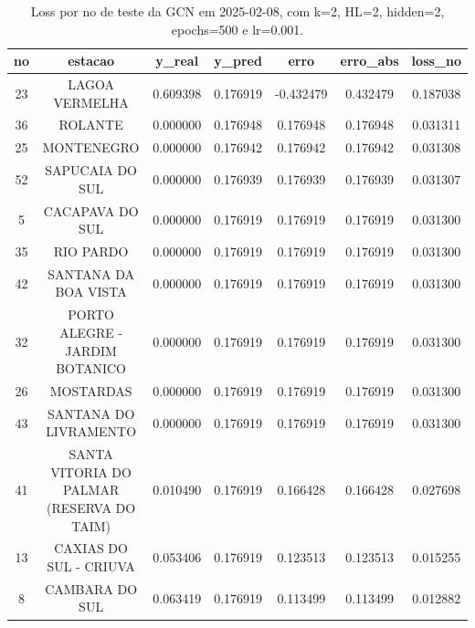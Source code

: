 \begin{table}[h]
\centering
\caption{Loss por no de teste da GCN em 2025-02-08, com k=2, HL=2, hidden=2, epochs=500 e lr=0.001.}
\label{tab:gcn_loss_k2_hl2_h2_e500_d20250208}
\begin{tabular}{ccccccc}
\toprule
no & estacao & y\_real & y\_pred & erro & erro\_abs & loss\_no \\
\midrule
23 & LAGOA VERMELHA & 0.609398 & 0.176919 & -0.432479 & 0.432479 & 0.187038 \\
36 & ROLANTE & 0.000000 & 0.176948 & 0.176948 & 0.176948 & 0.031311 \\
25 & MONTENEGRO & 0.000000 & 0.176942 & 0.176942 & 0.176942 & 0.031308 \\
52 & SAPUCAIA DO SUL & 0.000000 & 0.176939 & 0.176939 & 0.176939 & 0.031307 \\
5 & CACAPAVA DO SUL & 0.000000 & 0.176919 & 0.176919 & 0.176919 & 0.031300 \\
35 & RIO PARDO & 0.000000 & 0.176919 & 0.176919 & 0.176919 & 0.031300 \\
42 & SANTANA DA BOA VISTA & 0.000000 & 0.176919 & 0.176919 & 0.176919 & 0.031300 \\
32 & PORTO ALEGRE - JARDIM BOTANICO & 0.000000 & 0.176919 & 0.176919 & 0.176919 & 0.031300 \\
26 & MOSTARDAS & 0.000000 & 0.176919 & 0.176919 & 0.176919 & 0.031300 \\
43 & SANTANA DO LIVRAMENTO & 0.000000 & 0.176919 & 0.176919 & 0.176919 & 0.031300 \\
41 & SANTA VITORIA DO PALMAR (RESERVA DO TAIM) & 0.010490 & 0.176919 & 0.166428 & 0.166428 & 0.027698 \\
13 & CAXIAS DO SUL - CRIUVA & 0.053406 & 0.176919 & 0.123513 & 0.123513 & 0.015255 \\
8 & CAMBARA DO SUL & 0.063419 & 0.176919 & 0.113499 & 0.113499 & 0.012882 \\
\bottomrule
\end{tabular}
\end{table}
